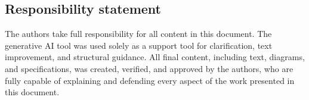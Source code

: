 \subsection*{Responsibility statement}
The authors take full responsibility for all content in this document. The generative AI tool was used solely as a support tool for clarification, text improvement, and structural guidance. All final content, including text, diagrams, and specifications, was created, verified, and approved by the authors, who are fully capable of explaining and defending every aspect of the work presented in this document.